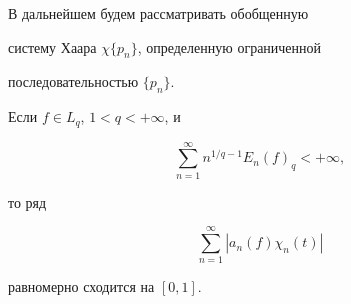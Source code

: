  


В дальнейшем будем рассматривать обобщенную 


систему Хаара $\chi\{p_n\}$, определенную ограниченной 


последовательностью $\{p_n\}$. 


 


\begin{thm} 


Если $f\in L_q$, $1<q<+\infty$, и 


\begin{equation} 


\sum^\infty_{n=1}n^{1/q-1}E_n(f)_q<+\infty, 


\end{equation} 


то ряд 


\begin{equation} 


\sum^\infty_{n=1}|a_n(f)\chi_n(t)| 


\end{equation} 


равномерно сходится на $[0,1]$. 


\end{thm} 


 


